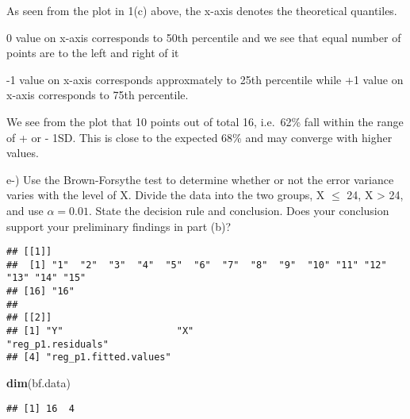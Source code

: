 \documentclass[
]{article}
\newenvironment{Shaded}{\begin{snugshade}}{\end{snugshade}}
\newcommand{\CommentTok}[1]{\textcolor[rgb]{0.56,0.35,0.01}{\textit{#1}}}
\newcommand{\KeywordTok}[1]{\textcolor[rgb]{0.13,0.29,0.53}{\textbf{#1}}}
\newcommand{\NormalTok}[1]{#1}
\newcommand{\OperatorTok}[1]{\textcolor[rgb]{0.81,0.36,0.00}{\textbf{#1}}}
\newcommand{\StringTok}[1]{\textcolor[rgb]{0.31,0.60,0.02}{#1}}
\begin{document}
As seen from the plot in 1(c) above, the x-axis denotes the theoretical
quantiles.

0 value on x-axis corresponds to 50th percentile and we see that equal
number of points are to the left and right of it

-1 value on x-axis corresponds approxmately to 25th percentile while +1
value on x-axis corresponds to 75th percentile.

We see from the plot that 10 points out of total 16, i.e.~62\% fall
within the range of + or - 1SD. This is close to the expected 68\% and
may converge with higher values.

e-) Use the Brown-Forsythe test to determine whether or not the error
variance varies with the level of X. Divide the data into the two
groups, X \(\leq\) 24, X \textgreater{} 24, and use \(\alpha=0.01\).
State the decision rule and conclusion. Does your conclusion support
your preliminary findings in part (b)?

\begin{Shaded}
\end{Shaded}

\begin{verbatim}
## [[1]]
##  [1] "1"  "2"  "3"  "4"  "5"  "6"  "7"  "8"  "9"  "10" "11" "12" "13" "14" "15"
## [16] "16"
## 
## [[2]]
## [1] "Y"                    "X"                    "reg_p1.residuals"    
## [4] "reg_p1.fitted.values"
\end{verbatim}

\begin{Shaded}
\begin{Highlighting}[]
\KeywordTok{dim}\NormalTok{(bf.data)}
\end{Highlighting}
\end{Shaded}

\begin{verbatim}
## [1] 16  4
\end{verbatim}
\end{document}
